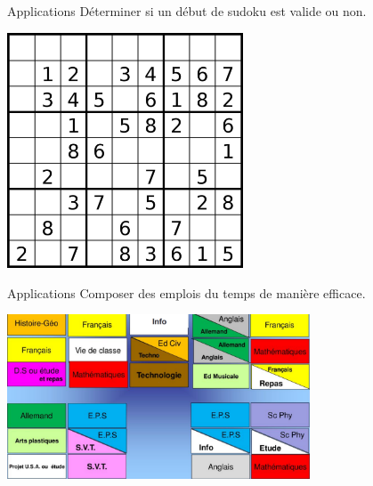 \documentclass[10pt]{beamer}
\begin{document}
\begin{frame}{Applications}
Déterminer si un début de sudoku est valide ou non.
\begin{center}
\includegraphics[width=7cm]{img/sudoku}
\end{center}
\end{frame}

\begin{frame}{Applications}
Composer des emplois du temps de manière efficace.
\begin{center}
\includegraphics[width=9cm]{img/edt}
\end{center}
\end{frame}
\end{document}
